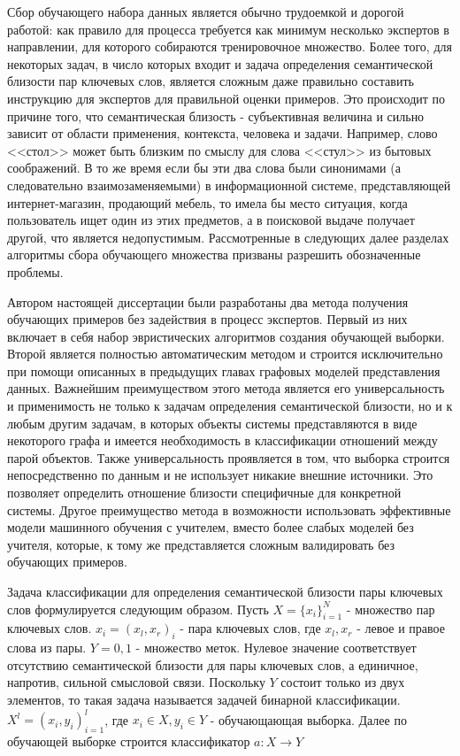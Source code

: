 Сбор обучающего набора данных является обычно трудоемкой и дорогой работой: как правило для процесса требуется как минимум несколько экспертов в направлении, для которого собираются тренировочное множество. Более того, для некоторых задач, в число которых входит и задача определения семантической близости пар ключевых слов, является сложным даже правильно составить инструкцию для экспертов для правильной оценки примеров. Это происходит по причине того, что семантическая близость - субъективная величина и сильно зависит от области применения, контекста, человека и задачи. Например, слово <<стол>> может быть близким по смыслу для слова <<стул>> из бытовых соображений. В то же время если бы эти два слова были синонимами (а следовательно взаимозаменяемыми) в информационной системе, представляющей интернет-магазин, продающий мебель, то имела бы место ситуация, когда пользователь ищет один из этих предметов, а в поисковой выдаче получает другой, что является недопустимым. Рассмотренные в следующих далее разделах алгоритмы сбора обучающего множества призваны разрешить обозначенные проблемы.

Автором настоящей диссертации были разработаны два метода получения обучающих примеров без задействия в процесс экспертов. Первый из них включает в себя набор эвристических алгоритмов создания обучающей выборки. Второй является полностью автоматическим методом и строится исключительно при помощи описанных в предыдущих главах графовых моделей представления данных. Важнейшим преимуществом этого метода является его универсальность и применимость не только к задачам определения семантической близости, но и к любым другим задачам, в которых объекты системы представляются в виде некоторого графа и имеется необходимость в классификации отношений между парой объектов. Также универсальность проявляется в том, что выборка строится непосредственно по данным и не использует никакие внешние источники. Это позволяет определить отношение близости специфичные для конкретной системы. Другое преимущество метода в возможности использовать эффективные модели машинного обучения с учителем, вместо более слабых моделей без учителя, которые, к тому же представляется сложным валидировать без обучающих примеров.

Задача классификации для определения семантической близости пары ключевых слов формулируется следующим образом. Пусть $X=\{x_i\}_{i=1}^N$ - множество пар ключевых слов. $x_i=(x_l,x_r)_i$ - пара ключевых слов, где $x_l,x_r$ - левое и правое слова из пары. $Y={0,1}$ - множество меток. Нулевое значение соответствует отсутствию семантической близости для пары ключевых слов, а единичное, напротив, сильной смысловой связи. Поскольку $Y$ состоит только из двух элементов, то такая задача называется задачей бинарной классификации. $X^l=(x_i,y_i)_{i=1}^l$, где $x_i \in X, y_i \in Y$ - обучающающая выборка. Далее по обучающей выборке строится классификатор $a: X\rightarrow Y$

